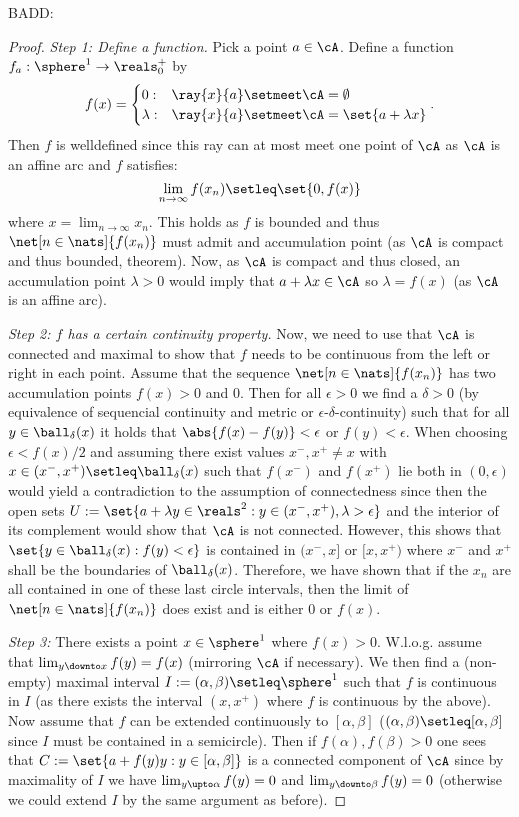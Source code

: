 BADD:%
\begin{proof}
    \emph{Step 1: Define a function.}
    Pick a point $a\in\cA$. Define a function $f_a:\sphere^1\to \reals_0^+$ by
    $$
    f(x)=\begin{cases}
        0 :& \ray{x}{a}\setmeet\cA=\emptyset\\
        \lambda :& \ray{x}{a}\setmeet\cA=\set{a+\lambda x}
    \end{cases}.
    $$
    Then $f$ is welldefined since this ray can at most meet one point of $\cA$ as $\cA$ is an affine arc and $f$ satisfies:
    $$
    \lim_{n\to\infty}{f(x_n)}\setleq\set{0,f(x)}
    $$
    where $x=\lim_{n\to\infty}{x_n}$. This holds as $f$ is bounded and thus $\net[n\in\nats]{f(x_n)}$ must admit and accumulation point (as $\cA$ is compact and thus bounded,  theorem). Now, as $\cA$ is compact and thus closed, an accumulation point $\lambda>0$ would imply that $a+\lambda x\in \cA$ so $\lambda=f(x)$ (as $\cA$ is an affine arc).

    \emph{Step 2: $f$ has a certain continuity property.}
    Now, we need to use that $\cA$ is connected and maximal to show that $f$ needs to be continuous from the left or right in each point. Assume that the sequence 
    $\net[n\in\nats]{f(x_n)}$ has two accumulation points $f(x)>0$ and $0$. Then for all $\epsilon>0$ we find a $\delta>0$ (by equivalence of sequencial continuity and metric or $\epsilon$-$\delta$-continuity) such that for all $y\in\ball_{\delta}(x)$ it holds that $\abs{f(x)-f(y)}<\epsilon$ or $f(y)<\epsilon$.
    When choosing $\epsilon<f(x)/2$ and assuming there exist values $x^-,x^+\neq x$ with  $x\in(x^-,x^+)\setleq\ball_{\delta}(x)$ such that $f(x^-)$ and $f(x^+)$ lie both in $(0,\epsilon)$ would yield a contradiction to the assumption of connectedness since then 
    the open sets $U:=\set{a+\lambda y\in\reals^2:y\in (x^-,x^+), \lambda>\epsilon}$ and the interior of its complement would show that $\cA$ is not connected.
    However, this shows that $\set{y\in\ball_{\delta}(x):f(y)<\epsilon}$ is contained in $(x^-,x]$ or $[x,x^+)$ where $x^-$ and $x^+$ shall be the boundaries of $\ball_{\delta}(x)$.
    Therefore, we have shown that if the $x_n$ are all contained in one of these last circle intervals, then the limit of $\net[n\in\nats]{f(x_n)}$ does exist and is either $0$ or $f(x)$.
    
    \emph{Step 3:} There exists a point $x\in\sphere^1$ where $f(x)>0$. W.l.o.g. assume that $\lim_{y\downto x}{f(y)}=f(x)$ (mirroring $\cA$ if necessary). We then find a (non-empty) maximal interval $I:=(\alpha,\beta)\setleq \sphere^1$ such that $f$ is continuous in $I$ (as there exists the interval $(x,x^+)$ where $f$ is continuous by the above). Now assume that $f$ can be extended continuously to $[\alpha,\beta]$ ($(\alpha,\beta)\setleq[\alpha,\beta]$ since $I$ must be contained in a semicircle).
    Then if $f(\alpha),f(\beta)>0$ one sees that $C:=\set{a+f(y)y:y\in[\alpha,\beta]}$ is a connected component of $\cA$ since by maximality of $I$ we have $\lim_{y\upto\alpha}{f(y)}=0$ and $\lim_{y\downto\beta}{f(y)}=0$ (otherwise we could extend $I$ by the same argument as before).
    


\end{proof}
